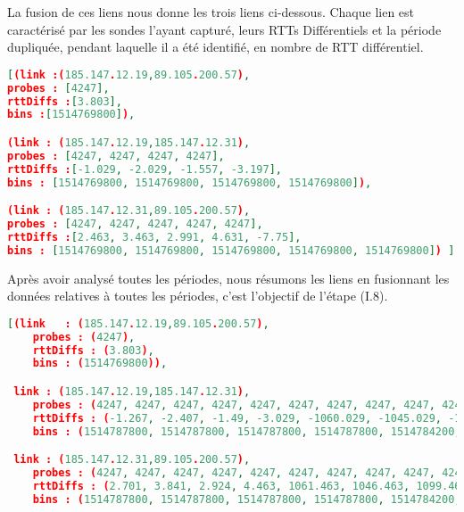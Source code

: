 La fusion de ces liens nous donne les trois liens ci-dessous. Chaque lien est caractérisé par les sondes l'ayant capturé, leurs  RTTs Différentiels et la période dupliquée, pendant laquelle il a été identifié, en nombre de RTT différentiel. 

\begin{lstlisting}[language=json,firstnumber=1, caption={Caractérisation des liens identifiés lors  de la période 1514769800 avec les traceroutes T1, T2, T3, T4 et T5}, basicstyle = \footnotesize, ]
[(link :(185.147.12.19,89.105.200.57),
probes : [4247],
rttDiffs :[3.803],
bins :[1514769800]),

(link : (185.147.12.19,185.147.12.31),
probes : [4247, 4247, 4247, 4247],
rttDiffs :[-1.029, -2.029, -1.557, -3.197],
bins : [1514769800, 1514769800, 1514769800, 1514769800]),

(link : (185.147.12.31,89.105.200.57),
probes : [4247, 4247, 4247, 4247, 4247],
rttDiffs :[2.463, 3.463, 2.991, 4.631, -7.75],
bins : [1514769800, 1514769800, 1514769800, 1514769800, 1514769800]) ]
\end{lstlisting}

Après avoir analysé  toutes les périodes, nous résumons les liens en fusionnant les données relatives à toutes les périodes, c'est l'objectif de l'étape (I.8).

\begin{lstlisting}[language=json,firstnumber=1, caption={Illustration de l'ordre des liens}, basicstyle = \footnotesize]
[(link   : (185.147.12.19,89.105.200.57), 
    probes : (4247), 
    rttDiffs : (3.803), 
    bins : (1514769800)),  

 link : (185.147.12.19,185.147.12.31), 
    probes : (4247, 4247, 4247, 4247, 4247, 4247, 4247, 4247, 4247, 4247, 4247, 4247, 4247, 4247, 4247, 4247, 4247, 4247, 4247, 4247, 4247, 4247, 4247, 4247), 
    rttDiffs : (-1.267, -2.407, -1.49, -3.029, -1060.029, -1045.029, -1098.029, -1080.029, -680.029, -845.029, -998.029, -800.029, -1.029, -2.029, -1.557, -3.197, -1.277, -2.017, -1.257, -2.968, -0.96, -1.967, -0.987, -3.201), 
    bins : (1514787800, 1514787800, 1514787800, 1514787800, 1514784200, 1514784200, 1514784200, 1514784200, 1514780600, 1514780600, 1514780600, 1514780600, 1514769800, 1514769800, 1514769800, 1514769800, 1514773400, 1514773400, 1514773400, 1514773400, 1514777000, 1514777000, 1514777000, 1514777000)),  

 link : (185.147.12.31,89.105.200.57),
    probes : (4247, 4247, 4247, 4247, 4247, 4247, 4247, 4247, 4247, 4247, 4247, 4247, 4247, 4247, 4247, 4247, 4247, 4247, 4247, 4247, 4247, 4247, 4247, 4247, 4247),
    rttDiffs : (2.701, 3.841, 2.924, 4.463, 1061.463, 1046.463, 1099.463, 1081.463, 681.463, 846.463, 999.463, 801.463, 2.463, 3.463, 2.991, 4.631, -7.75, 2.711, 3.451, 2.691, 4.402, 2.394, 3.401, 2.421, 4.635),
    bins : (1514787800, 1514787800, 1514787800, 1514787800, 1514784200, 1514784200, 1514784200, 1514784200, 1514780600, 1514780600, 1514780600, 1514780600, 1514769800, 1514769800, 1514769800, 1514769800, 1514769800, 1514773400, 1514773400, 1514773400, 1514773400, 1514777000, 1514777000, 1514777000, 1514777000))]
\end{lstlisting}


